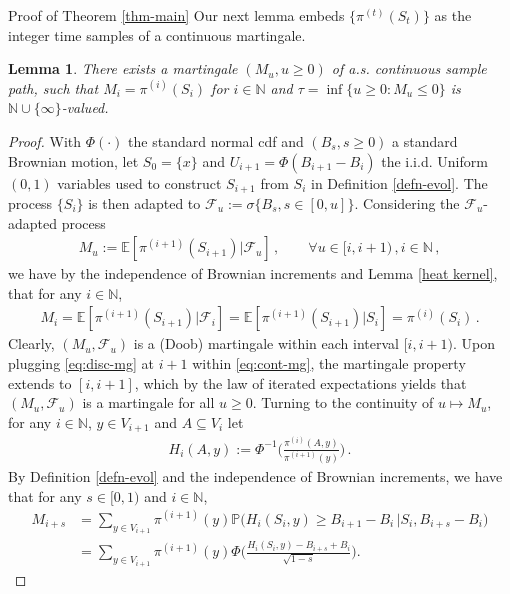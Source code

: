 \documentclass[12pt,reqno]{amsart}
\numberwithin{equation}{section}
\newtheorem{lem}[thm]{Lemma}
\theoremstyle{definition}
\begin{document}
\begin{section}{Proof of Theorem \ref{thm-main}}
Our next lemma embeds 
$\{\pi^{(t)}(S_t)\}$ as the integer time samples of 
a continuous martingale.
\begin{lem}\label{embedding}
There exists a martingale $(M_u, u \ge 0)$ of a.s. continuous sample path,
such that $M_i=\pi^{(i)}(S_i)$ for $i\in{\mathbb{N}}$ {and 
$\tau=\inf\{u \ge 0 : M_u \le 0 \}$ is 
${\mathbb{N}} \cup \{\infty\}$-valued.}
\end{lem}
\begin{proof} With
$\Phi(\cdot)$ the standard normal {{\sc\lowercase{{cdf}}}} and
$(B_s, s \ge 0)$ a
standard Brownian motion,   
let $S_0=\{x\}$ and
$U_{i+1}=\Phi(B_{i+1}-B_i)$ the i.i.d. 
Uniform$(0,1)$ variables used to construct $S_{i+1}$ 
from $S_i$ in Definition \ref{defn-evol}. The process $\{S_i\}$ is 
then adapted to 
${\mathcal{F}}_u:=\sigma\{B_s,  s \in [0,u] \}$.
Considering the 
${\mathcal{F}}_u$-adapted process 
\begin{align}\label{eq:cont-mg}
M_u:={\mathbb{E}}[\pi^{(i+1)}(S_{i+1})|{\mathcal{F}}_u] \,, \qquad  \forall u \in [i,i+1) \,, i \in {\mathbb{N}}\,,
\end{align}
we have by the independence of Brownian increments and Lemma \ref{heat kernel}, 
that for any $i \in {\mathbb{N}}$,
\begin{align}\label{eq:disc-mg}
M_i = {\mathbb{E}}[\pi^{(i+1)}(S_{i+1})| {\mathcal{F}}_i] = {\mathbb{E}}[\pi^{(i+1)}(S_{i+1})|S_i]=\pi^{(i)}(S_i) \,.
\end{align}
Clearly, $(M_u,{\mathcal{F}}_u)$ is a (Doob) martingale within each interval $[i,i+1)$.
Upon plugging \eqref{eq:disc-mg} at $i+1$ within
\eqref{eq:cont-mg}, the martingale property
extends to $[i,i+1]$, which by the law of iterated expectations yields 
that $(M_u,{\mathcal{F}}_u)$ is a martingale for all $u \ge 0$. 
Turning to the continuity of $u \mapsto M_u$, for any $i \in {\mathbb{N}}$, $y \in V_{i+1}$ 
and $A \subseteq V_{i}$ let
\begin{align*}
H_i(A,y):=\Phi^{-1}\Big(\frac{\pi^{(i)}(A,y)}{\pi^{(i+1)}(y)}\Big)\,.
\end{align*}
By Definition \ref{defn-evol} and the independence of Brownian increments, we have that 
for any $s\in [0,1)$ and $i \in {\mathbb{N}}$, 
\begin{align}
M_{i+s}
&=\sum_{y\in V_{i+1}}\pi^{(i+1)}(y){\mathbb{P}}\big(H_i(S_i,y)\ge B_{i+1}-B_i \,| S_i, B_{i+s}-B_i \big) \nonumber \\
&=\sum_{y\in V_{i+1}}\pi^{(i+1)}(y)\Phi\Big(\frac{H_i(S_i,y)-B_{i+s}+B_i}{\sqrt{1-s}}\Big). \label{continuity}
\end{align}

\end{proof}
\end{section}
\end{document}
